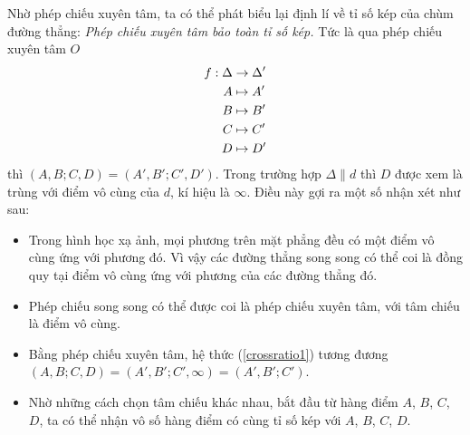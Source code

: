 \documentclass{article} %
\begin{document}
        Nhờ phép chiếu xuyên tâm, ta có thể phát biểu lại định lí về tỉ số kép của chùm đường thẳng: \textit{Phép chiếu xuyên tâm bảo toàn tỉ số kép.} Tức là qua phép chiếu xuyên tâm \(O\)
        \begin{equation}
            \begin{aligned}
                f: \Delta & \to \Delta' \\
                A & \mapsto A' \\
                B & \mapsto B' \\
                C & \mapsto C' \\
                D & \mapsto D'
            \end{aligned}
            \notag
        \end{equation}
        thì \((A,B;C,D) = (A',B';C',D')\). Trong trường hợp \(\Delta \parallel d\) thì \(D\) được xem là trùng với điểm vô cùng của \(d\), kí hiệu là \(\infty\). Điều này gợi ra một số nhận xét như sau:
        \begin{itemize}
            \item Trong hình học xạ ảnh, mọi phương trên mặt phẳng đều có một điểm vô cùng ứng với phương đó. Vì vậy các đường thẳng song song có thể coi là đồng quy tại điểm vô cùng ứng với phương của các đường thẳng đó.
            \item Phép chiếu song song có thể được coi là phép chiếu xuyên tâm, với tâm chiếu là điểm vô cùng.
            \item Bằng phép chiếu xuyên tâm, hệ thức (\ref{crossratio1}) tương đương \((A,B;C,D) = (A',B';C',\infty) = (A',B';C')\).
            \item Nhờ những cách chọn tâm chiếu khác nhau, bắt đầu từ hàng điểm \(A\), \(B\), \(C\), \(D\), ta có thể nhận vô số hàng điểm có cùng tỉ số kép với \(A\), \(B\), \(C\), \(D\).
        \end{itemize}
\end{document}
